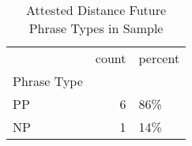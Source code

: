 \begin{table}[htbp!]
\centering
\caption{Attested Distance Future Phrase Types in Sample}
\label{table:distfut_phtype_ct}
\begin{tabular}{lrl}
\toprule
{} &  count & percent \\
Phrase Type &        &         \\
\midrule
PP          &      6 &     86\% \\
NP          &      1 &     14\% \\
\bottomrule
\end{tabular}
\end{table}
